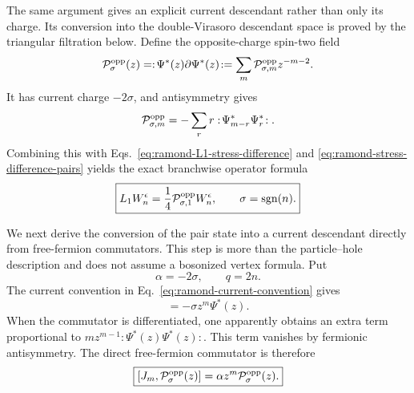\documentclass[11pt]{article}
\begin{document}
The same argument gives an explicit current descendant rather than only its
charge.  Its conversion into the double-Virasoro descendant space is proved
by the triangular filtration below.
Define the opposite-charge spin-two field
\begin{equation}
 {\cal P}^{\mathrm{opp}}_\sigma(z)
 =:\!\Psi^*(z)\partial\Psi^*(z)\!:
 =\sum_m{\cal P}^{\mathrm{opp}}_{\sigma,m}z^{-m-2}.
\end{equation}
It has current charge \(-2\sigma\), and antisymmetry gives
\begin{equation}
 {\cal P}^{\mathrm{opp}}_{\sigma,m}
 =-\sum_r r:\!\Psi^*_{m-r}\Psi^*_r\!:.
\end{equation}
Combining this with Eqs.~\eqref{eq:ramond-L1-stress-difference} and
\eqref{eq:ramond-stress-difference-pairs} yields the exact branchwise
operator formula
\begin{equation}
 \boxed{
 L_1W_n^\epsilon
 =\frac14{\cal P}^{\mathrm{opp}}_{\sigma,1}W_n^\epsilon,
 \qquad \sigma=\operatorname{sgn}(n).}
 \label{eq:ramond-L1-pair-field}
\end{equation}

We next derive the conversion of the pair state into a current descendant
directly from free-fermion commutators.  This step is more than the
particle--hole description and does not assume a bosonized vertex formula.
Put
\begin{equation}
 \alpha=-2\sigma,
 \qquad q=2n.
 \label{eq:ramond-pair-alpha-q}
\end{equation}
The current convention in Eq.~\eqref{eq:ramond-current-convention} gives
\begin{equation}
 [J_m,\Psi^*(z)]=-\sigma z^m\Psi^*(z).
\end{equation}
When the commutator is differentiated, one apparently obtains an extra
term proportional to
\(m z^{m-1}:\!\Psi^*(z)\Psi^*(z)\!:\).  This term vanishes by fermionic
antisymmetry.  The direct free-fermion commutator is therefore
\begin{equation}
 \boxed{
 [J_m,{\cal P}^{\mathrm{opp}}_\sigma(z)]
 =\alpha z^m{\cal P}^{\mathrm{opp}}_\sigma(z).}
 \label{eq:ramond-current-pair-commutator}
\end{equation}
\end{document}
